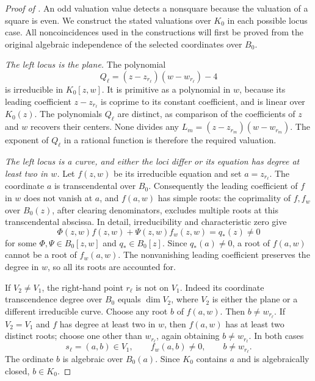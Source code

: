 \begin{proof}[Proof of ]
An odd valuation value detects a nonsquare because the valuation of a square
is even. We construct the stated valuations over \(K_0\) in each
possible locus case. All noncoincidences used in the constructions will
first be proved from the original algebraic independence of the selected coordinates over \(B_0\).

\emph{The left locus is the plane.}
The polynomial
\[
 Q_\ell=(z-z_{r_\ell})(w-w_{r_\ell})-4
\]
is irreducible in \(K_0[z,w]\). It is primitive as a polynomial in
\(w\), because its leading coefficient \(z-z_{r_\ell}\) is coprime
to its constant coefficient, and is linear over \(K_0(z)\). The
polynomials \(Q_\ell\) are distinct, as comparison of the coefficients
of \(z\) and \(w\) recovers their centers. None divides any
\(L_m=(z-z_{r_m})(w-w_{r_m})\). The exponent of \(Q_\ell\) in a
rational function is therefore the required valuation.

\emph{The left locus is a curve, and either the loci differ or its
equation has degree at least two in \(w\).}
Let \(f(z,w)\) be its irreducible equation and set
\(a=z_{r_\ell}\). The coordinate \(a\) is transcendental over
\(B_0\). Consequently the leading coefficient of \(f\) in \(w\)
does not vanish at \(a\), and \(f(a,w)\) has simple roots: the
coprimality of \(f,f_w\) over \(B_0(z)\), after clearing denominators,
excludes multiple roots at this transcendental abscissa.
In detail, irreducibility and characteristic zero give
\[
 \Phi(z,w)f(z,w)+\Psi(z,w)f_w(z,w)=q_*(z)\ne0
\]
for some \(\Phi,\Psi\in B_0[z,w]\) and \(q_*\in B_0[z]\).
Since \(q_*(a)\ne0\), a root of \(f(a,w)\) cannot be a root of
\(f_w(a,w)\). The nonvanishing leading coefficient preserves the
degree in \(w\), so all its roots are accounted for.

If \(V_2\ne V_1\), the right-hand point \(r_\ell\) is not on \(V_1\).
Indeed its coordinate transcendence degree over \(B_0\) equals \(\dim V_2\), where \(V_2\) is either the plane or a
different irreducible curve. Choose any root \(b\) of \(f(a,w)\).
Then \(b\ne w_{r_\ell}\). If \(V_2=V_1\) and \(f\) has degree at least two
in \(w\), then \(f(a,w)\) has at least two distinct roots; choose one
other than \(w_{r_\ell}\), again
obtaining \(b\ne w_{r_\ell}\). In both cases
\[
 s_\ell=(a,b)\in V_1,\qquad
 f_w(a,b)\ne0,\qquad b\ne w_{r_\ell}.
\]
The ordinate \(b\) is algebraic over \(B_0(a)\). Since \(K_0\)
contains \(a\) and is algebraically closed, \(b\in K_0\).


\end{proof}
